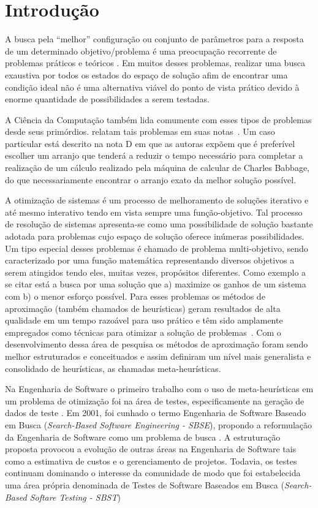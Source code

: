 \chapter[Introdução]{Introdução}

A busca pela ``melhor'' configuração ou conjunto de parâmetros para a resposta de um determinado objetivo/problema é uma preocupação recorrente de problemas práticos e teóricos \cite{combinatorialoptimization1998}. Em muitos desses problemas, realizar uma busca exaustiva por todos os estados do espaço de solução afim de encontrar uma condição ideal não é uma alternativa viável do ponto de vista prático devido à enorme quantidade de possibilidades a serem testadas. 

A Ciência da Computação também lida comumente com esses tipos de problemas desde seus primórdios.  relatam tais problemas em suas notas~\cite{menabrea1842sketch}. Um caso particular está descrito na nota D em que as autoras expõem que é preferível escolher um arranjo que tenderá a reduzir o tempo necessário para completar a realização de um cálculo realizado pela 
máquina de calcular de Charles Babbage, do que necessariamente encontrar o arranjo exato da melhor solução possível\cite{menabrea1842sketch}.

A otimização de sistemas é um processo de melhoramento de soluções iterativo e até mesmo interativo tendo em vista sempre uma função-objetivo. Tal processo de resolução de sistemas apresenta-se como uma possibilidade de solução bastante adotada para problemas cujo espaço de solução oferece inúmeras possibilidades. Um tipo especial desses problemas é chamado de problema multi-objetivo, sendo caracterizado por uma função matemática representando diversos objetivos a serem atingidos tendo eles, muitas vezes, propósitos diferentes. Como exemplo a se citar está a busca por uma solução que a) maximize os ganhos de um sistema  com b) o menor esforço possível.  Para esses problemas os métodos de aproximação (também chamados de heurísticas) geram resultados de alta qualidade em um tempo razoável para uso prático e têm sido amplamente empregados como técnicas para otimizar a solução de problemas~\cite{gendreau2005metaheuristics}. Com o desenvolvimento dessa área de pesquisa os métodos de aproximação foram sendo melhor estruturados e conceituados e assim definiram um nível mais generalista e consolidado de heurísticas, as chamadas meta-heurísticas.

Na Engenharia de Software o primeiro trabalho com o uso de meta-heurísticas em um problema de otimização foi na área de testes, especificamente na geração de dados de teste \cite{miller1976automatic}. Em 2001, foi cunhado o termo Engenharia de Software Baseado em Busca (\textit{Search-Based Software Engineering - SBSE}), propondo a reformulação da Engenharia de Software como um problema de busca \cite{harman2001search}. A estruturação proposta provocou a evolução de outras áreas na Engenharia de Software tais como a estimativa de custos e o gerenciamento de projetos. Todavia, os testes continuam dominando o interesse da comunidade de modo que foi estabelecida  uma área própria denominada de Testes de Software Baseados em Busca (\textit{Search-Based Softare Testing - SBST}) \cite{harman2012search}

